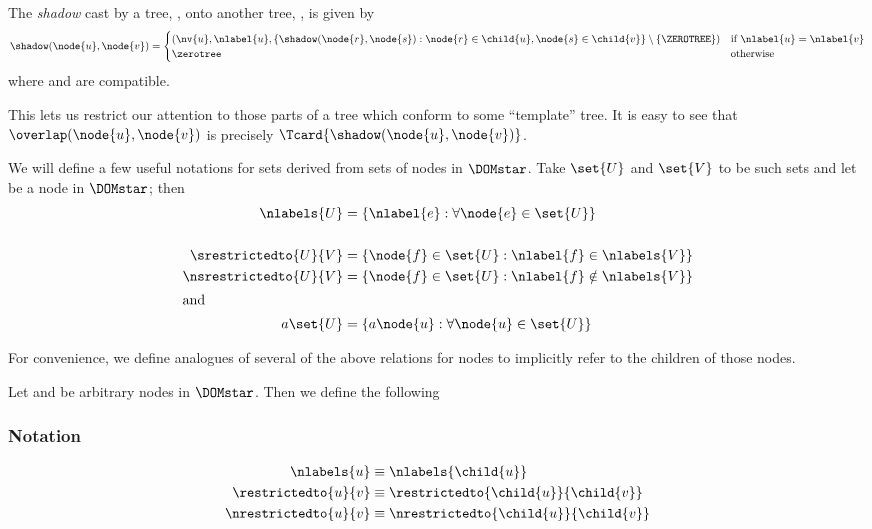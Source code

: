 \begin{definition}\label{shadow}
The \emph{shadow} cast by a tree, , onto another tree,
, is given by
\[
\shadow(\node{u},\node{v}) = \begin{cases}
  \left(\nv{u},\nlabel{u},\{\shadow(\node{r},\node{s}):\node{r}\in\child{u},\node{s}\in\child{v}\}\setminus\{\ZEROTREE\}\right)&\text{if~}\nlabel{u}=\nlabel{v}\\
  \zerotree&\text{otherwise}
\end{cases}
\]
where  and  are compatible.
\end{definition}
This lets us restrict our attention to those parts of a tree which
conform to some ``template'' tree.  It is easy to see that
$\overlap(\node{u},\node{v})$ is precisely
$\Tcard{\shadow(\node{u},\node{v})}$.

\begin{definition}\label{useful-set-functions}
  We will define a few useful notations for sets derived from sets of
  nodes in $\DOMstar$. Take \(\set{U}\) and \(\set{V}\) to be such
  sets and let
   be a node in $\DOMstar$; then 
  \begin{align*}
      \nlabels{U} &= \{\nlabel{e}: \forall \node{e} \in \set{U}\} \notag\\
      & \notag\\
      \srestrictedto{U}{V} &= \{\node{f} \in \set{U}: \nlabel{f} \in \nlabels{V} \} \notag\\
      \nsrestrictedto{U}{V} &= \{ \node{f} \in \set{U}: \nlabel{f} \notin \nlabels{V} \} \label{restrictions}\notag\\
      \intertext{and}
      a \set{U} &= \{a \node{u}: \forall \node{u} \in \set{U}\} \notag
  \end{align*}
\end{definition}

\begin{definition}\label{useful-node-functions}
  For convenience, we define analogues of several of the above
  relations for nodes to implicitly refer to the children of
  those nodes.

  Let  and  be arbitrary nodes in $\DOMstar$.  Then we
  define the following
  \subsubsection{Notation}
  \begin{align*}
    \nlabels{u} &\equiv \nlabels{\child{u}}\\
    \restrictedto{u}{v} &\equiv \restrictedto{\child{u}}{\child{v}}\\
    \nrestrictedto{u}{v} &\equiv \nrestrictedto{\child{u}}{\child{v}}
  \end{align*}
\end{definition}


